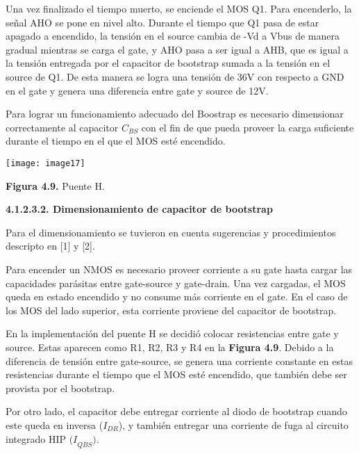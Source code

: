 \documentclass{article} %
\begin{document}
\noindent 

\noindent Una vez finalizado el tiempo muerto, se enciende el MOS Q1. Para encenderlo, la se\~{n}al AHO se pone en nivel alto. Durante el tiempo que Q1 pasa de estar apagado a encendido, la tensi\'{o}n en el source cambia de -Vd a Vbus de manera gradual mientras se carga el gate, y AHO pasa a ser igual a AHB, que es igual a la tensi\'{o}n entregada por el capacitor de bootstrap sumada a la tensi\'{o}n en el source de Q1. De esta manera se logra una tensi\'{o}n de 36V con respecto a GND en el gate y genera una diferencia entre gate y source de 12V.

\noindent 

\noindent Para lograr un funcionamiento adecuado del Boostrap es necesario dimensionar correctamente al capacitor $C_{BS}$ con el fin de que pueda proveer la carga suficiente durante el tiempo en el que el MOS est\'{e} encendido. 

\noindent 

\noindent \texttt{[image: image17]}

\noindent \textbf{Figura 4.9. }Puente H.

\noindent 
{\bf 4.1.2.3.2. Dimensionamiento de capacitor de bootstrap}

\noindent Para el dimensionamiento se tuvieron en cuenta sugerencias y procedimientos descripto en [1] y [2].

\noindent 

\noindent Para encender un NMOS es necesario proveer corriente a su gate hasta cargar las capacidades par\'{a}sitas entre gate-source y gate-drain. Una vez cargadas, el MOS queda en estado encendido y no consume m\'{a}s corriente en el gate. En el caso de los MOS del lado superior, esta corriente proviene del capacitor de bootstrap. 

\noindent 

\noindent En la implementaci\'{o}n del puente H se decidi\'{o} colocar resistencias entre gate y source. Estas aparecen como R1, R2, R3 y R4 en la \textbf{Figura 4.9}. Debido a la diferencia de tensi\'{o}n entre gate-source, se genera una corriente constante en estas resistencias durante el tiempo que el MOS est\'{e} encendido, que tambi\'{e}n debe ser provista por el  bootstrap.

\noindent 

\noindent Por otro lado, el capacitor debe entregar corriente al diodo de bootstrap cuando este queda en inversa ($I_{DR}$), y tambi\'{e}n entregar una corriente de fuga al circuito integrado HIP ${(I}_{QBS})$.
\end{document}
